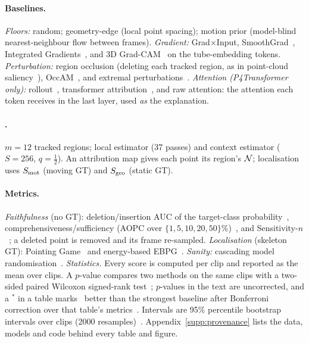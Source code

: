 \paragraph{Baselines.}
\emph{Floors:} random; geometry-edge (local point spacing); motion prior (model-blind nearest-neighbour flow between frames). \emph{Gradient:} Grad$\times$Input, SmoothGrad~\cite{smilkov2017smoothgrad}, Integrated Gradients~\cite{sundararajan2017ig}, and 3D Grad-CAM~\cite{selvaraju2017gradcam} on the tube-embedding tokens. \emph{Perturbation:} region occlusion (deleting each tracked region, as in point-cloud saliency~\cite{zheng2019pointcloudsaliency}), OccAM~\cite{schinagl2022occam}, and extremal perturbations~\cite{fong2019extremal}. \emph{Attention (P4Transformer only):} rollout~\cite{abnar2020rollout}, transformer attribution~\cite{chefer2021transformer}, and raw attention: the attention each token receives in the last layer, used \emph{as} the explanation.
\paragraph{\method.} $m{=}12$ tracked regions; local estimator (37 passes) and context estimator ($S{=}256$, $q{=}\tfrac12$). An attribution map gives each point its region's $\mathcal{N}$; localisation uses $S_{\mathrm{mot}}$ (moving GT) and $S_{\mathrm{geo}}$ (static GT).

\paragraph{Metrics.}
\emph{Faithfulness} (no GT): deletion/insertion AUC of the target-class probability~\cite{petsiuk2018rise}, comprehensiveness/sufficiency (AOPC over $\{1,5,10,20,50\}\%$)~\cite{deyoung2020eraser}, and Sensitivity-$n$~\cite{ancona2018sensitivity}; a deleted point is removed and its frame re-sampled. \emph{Localisation} (skeleton GT): Pointing Game~\cite{zhang2018pointing} and energy-based EBPG~\cite{wang2020scorecam}. \emph{Sanity:} cascading model randomisation~\cite{adebayo2018sanity}. \emph{Statistics.} Every score is computed per clip and reported as the mean over clips. A $p$-value compares two methods on the same clips with a two-sided paired Wilcoxon signed-rank test~\cite{wilcoxon1945}; $p$-values in the text are uncorrected, and a $^\ast$ in a table marks \method\ better than the strongest baseline after Bonferroni correction over that table's metrics~\cite{dunn1961}. Intervals are 95\% percentile bootstrap intervals over clips (2000 resamples)~\cite{efron1979bootstrap}. Appendix~\ref{supp:provenance} lists the data, models and code behind every table and figure.
